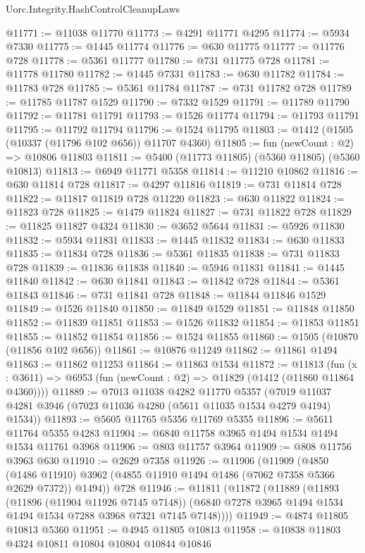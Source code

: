 \begin{lexlean}{Uorc.Integrity.HashControlCleanupLaws}
\begin{coremodule}
@11771 := @11038 @11770
@11773 := @4291 @11771 @4295
@11774 := @5934 @7330
@11775 := @1445 @11774
@11776 := @630 @11775
@11777 := @11776 @728
@11778 := @5361 @11777
@11780 := @731 @11775 @728
@11781 := @11778 @11780
@11782 := @1445 @7331
@11783 := @630 @11782
@11784 := @11783 @728
@11785 := @5361 @11784
@11787 := @731 @11782 @728
@11789 := @11785 @11787 @1529
@11790 := @7332 @1529
@11791 := @11789 @11790
@11792 := @11781 @11791
@11793 := @1526 @11774
@11794 := @11793 @11791
@11795 := @11792 @11794
@11796 := @1524 @11795
@11803 := @1412 (@1505 (@10337 (@11796 @102 @656)) @11707 @4360)
@11805 := fun (newCount : @2) => @10806 @11803
@11811 := @5400 (@11773 @11805) (@5360 @11805) (@5360 @10813)
@11813 := @6949 @11771 @5358
@11814 := @11210 @10862
@11816 := @630 @11814 @728
@11817 := @4297 @11816
@11819 := @731 @11814 @728
@11822 := @11817 @11819 @728 @11220
@11823 := @630 @11822
@11824 := @11823 @728
@11825 := @1479 @11824
@11827 := @731 @11822 @728
@11829 := @11825 @11827 @4324
@11830 := @3652 @5644
@11831 := @5926 @11830
@11832 := @5934 @11831
@11833 := @1445 @11832
@11834 := @630 @11833
@11835 := @11834 @728
@11836 := @5361 @11835
@11838 := @731 @11833 @728
@11839 := @11836 @11838
@11840 := @5946 @11831
@11841 := @1445 @11840
@11842 := @630 @11841
@11843 := @11842 @728
@11844 := @5361 @11843
@11846 := @731 @11841 @728
@11848 := @11844 @11846 @1529
@11849 := @1526 @11840
@11850 := @11849 @1529
@11851 := @11848 @11850
@11852 := @11839 @11851
@11853 := @1526 @11832
@11854 := @11853 @11851
@11855 := @11852 @11854
@11856 := @1524 @11855
@11860 := @1505 (@10870 (@11856 @102 @656))
@11861 := @10876 @11249
@11862 := @11861 @1494
@11863 := @11862 @11253
@11864 := @11863 @1534
@11872 := @11813
    (fun (x : @3611) => @6953 (fun (newCount : @2) => @11829 (@1412 (@11860 @11864 @4360))))
@11889 := @7013
    @11038
    @4282
    @11770
    @5357
    (@7019 @11037 @4281 @3946 (@7023 @11036 @4280 (@5611 @11035 @1534 @4279 @4194) @1534))
@11893 := @5605 @11765 @5356 @11769 @5355
@11896 := @5611 @11764 @5355 @4283
@11904 := @6840 @11758 @3965 @1494 @1534 @1494 @1534 @11761 @3968
@11906 := @803 @11757 @3964
@11909 := @808 @11756 @3963 @630
@11910 := @2629 @7358
@11926 := @11906
    (@11909
      (@4850 (@1486 @11910) @3962 (@4855 @11910 @1494 @1486 (@7062 @7358 @5366 @2629 @7372)) @1494))
    @728
@11946 := @11811
    (@11872
      (@11889
        (@11893
          (@11896 (@11904 @11926 @7145 @7148))
          (@6840 @7278 @3965 @1494 @1534 @1494 @1534 @7288 @3968 @7321 @7145 @7148))))
@11949 := @4874 @11805 @10813 @5360
@11951 := @4945 @11805 @10813
@11958 := @10838 @11803 @4324 @10811 @10804 @10804 @10844 @10846

\end{coremodule}
\end{lexlean}
